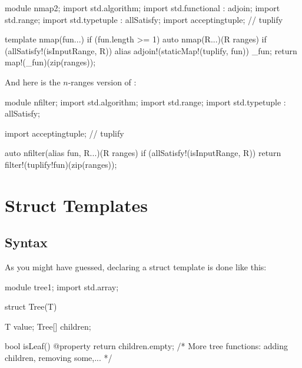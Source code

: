 \begin{dcode}
module nmap2;
import std.algorithm;
import std.functional : adjoin;
import std.range;
import std.typetuple : allSatisfy;
import acceptingtuple; // tuplify

template nmap(fun...) if (fun.length >= 1)
{
    auto nmap(R...)(R ranges) if (allSatisfy!(isInputRange, R))
    {
        alias adjoin!(staticMap!(tuplify, fun)) _fun;
        return map!(_fun)(zip(ranges));
    }
}
\end{dcode}


And here is the $n$-ranges version of :

\begin{dcode}
module nfilter;
import std.algorithm;
import std.range;
import std.typetuple : allSatisfy;

import acceptingtuple; // tuplify

auto nfilter(alias fun, R...)(R ranges) if (allSatisfy!(isInputRange, R))
{
    return filter!(tuplify!fun)(zip(ranges));
}
\end{dcode}


\section{Struct Templates}\label{structtemplates}
\subsection{Syntax}\label{structsyntax}

As you might have guessed, declaring a struct template is done like this:

\begin{dcode}
module tree1;
import std.array;

struct Tree(T)
{
    T value;
    Tree[] children;

    bool isLeaf() @property { return children.empty;}
    /* More tree functions: adding children, removing some,... */
}     
\end{dcode}


